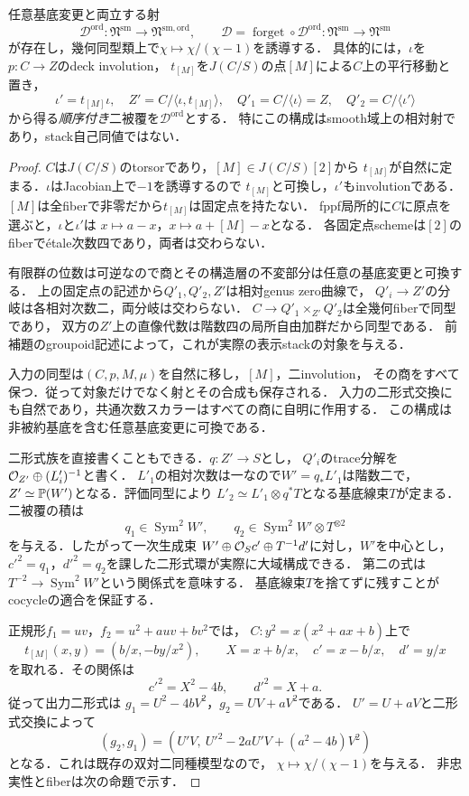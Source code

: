 \begin{theorem}[spectral双対化の非忠実な相対射]
\label{thm:qa-spectral-relative-nonfaithful-map}
任意基底変更と両立する射
\[
 \mathscr D^{\mathrm{ord}}:\mathfrak N^{\mathrm{sm}}
       \longrightarrow\mathfrak N^{\mathrm{sm,ord}},\qquad
 \mathscr D=\operatorname{forget}\circ\mathscr D^{\mathrm{ord}}
       :\mathfrak N^{\mathrm{sm}}\longrightarrow\mathfrak N^{\mathrm{sm}}
\]
が存在し，幾何同型類上で$\chi\mapsto\chi/(\chi-1)$を誘導する．
具体的には，$\iota$を$p:C\to Z$のdeck involution，
$t_{[M]}$を$J(C/S)$の点$[M]$による$C$上の平行移動と置き，
\[
 \iota'=t_{[M]}\iota,\quad
 Z'=C/\langle\iota,t_{[M]}\rangle,\quad
 Q'_1=C/\langle\iota\rangle=Z,\quad
 Q'_2=C/\langle\iota'\rangle
\]
から得る\emph{順序付き}二被覆を$\mathscr D^{\mathrm{ord}}$とする．
特にこの構成はsmooth域上の相対射であり，stack自己同値ではない．
\end{theorem}
\begin{proof}
$C$は$J(C/S)$のtorsorであり，$[M]\in J(C/S)[2]$から
$t_{[M]}$が自然に定まる．$\iota$はJacobian上で$-1$を誘導するので
$t_{[M]}$と可換し，$\iota'$もinvolutionである．
$[M]$は全fiberで非零だから$t_{[M]}$は固定点を持たない．
fppf局所的に$C$に原点を選ぶと，$\iota$と$\iota'$は
$x\mapsto a-x$，$x\mapsto a+[M]-x$となる．
各固定点schemeは$[2]$のfiberで\'etale次数四であり，両者は交わらない．

有限群の位数は可逆なので商とその構造層の不変部分は任意の基底変更と可換する．
上の固定点の記述から$Q'_1,Q'_2,Z'$は相対genus zero曲線で，
$Q'_i\to Z'$の分岐は各相対次数二，両分岐は交わらない．
$C\to Q'_1\times_{Z'}Q'_2$は全幾何fiberで同型であり，
双方の$Z'$上の直像代数は階数四の局所自由加群だから同型である．
前補題のgroupoid記述によって，これが実際の表示stackの対象を与える．

入力の同型は$(C,p,M,\mu)$を自然に移し，$[M]$，二involution，
その商をすべて保つ．従って対象だけでなく射とその合成も保存される．
入力の二形式交換にも自然であり，共通次数スカラーはすべての商に自明に作用する．
この構成は非被約基底を含む任意基底変更に可換である．

二形式族を直接書くこともできる．$q:Z'\to S$とし，
$Q'_i$のtrace分解を$\mathcal O_{Z'}\oplus (L'_i)^{-1}$と書く．
$L'_1$の相対次数は一なので$W'=q_*L'_1$は階数二で，
$Z'\simeq\mathbb P(W')$となる．評価同型により
$L'_2\simeq L'_1\otimes q^*T$となる基底線束$T$が定まる．
二被覆の積は
\[
 q_1\in\operatorname{Sym}^2W',\qquad
 q_2\in\operatorname{Sym}^2W'\otimes T^{\otimes2}
\]
を与える．したがって一次生成束
$W'\oplus\mathcal O_Sc'\oplus T^{-1}d'$に対し，$W'$を中心とし，
$c'^2=q_1$，$d'^2=q_2$を課した二形式環が実際に大域構成できる．
第二の式は$T^{-2}\to\operatorname{Sym}^2W'$という関係式を意味する．
基底線束$T$を捨てずに残すことがcocycleの適合を保証する．

正規形$f_1=uv$，$f_2=u^2+a uv+bv^2$では，
$C:y^2=x(x^2+ax+b)$上で
\[
 t_{[M]}(x,y)=(b/x,-by/x^2),\qquad
 X=x+b/x,\quad c'=x-b/x,\quad d'=y/x
\]
を取れる．その関係は
\[
 c'^2=X^2-4b,\qquad d'^2=X+a.
\]
従って出力二形式は
$g_1=U^2-4bV^2$，$g_2=UV+aV^2$である．
$U'=U+aV$と二形式交換によって
\[
 (g_2,g_1)=(U'V,\ U'^2-2aU'V+(a^2-4b)V^2)
\]
となる．これは既存の双対二同種模型なので，
$\chi\mapsto\chi/(\chi-1)$を与える．
非忠実性とfiberは次の命題で示す．
\end{proof}

